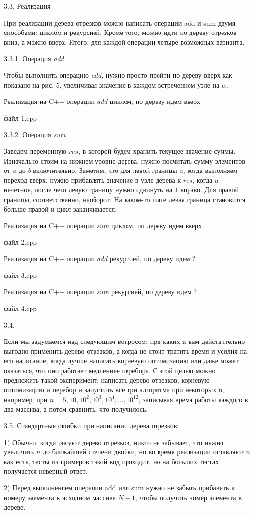 \documentclass[11pt,a4paper,oneside]{article}
\begin{document}
3.3. Реализация

При реализации дерева отрезков можно написать операции add и sum 
двумя способами: циклом и рекурсией. Кроме того, можно идти по 
дереву отрезков вниз, а можно вверх. Итого, для каждой операции 
четыре возможных варианта.

3.3.1. Операция {\it add}

Чтобы выполнить операцию {\it add}, нужно просто пройти по дереву вверх 
как показано на рис. 5, увеличивая значение в каждом 
встреченном узле на $w$. 

Реализация на C++ операции {\it add} циклом, по дереву идем вверх

файл 1.cpp

3.3.2. Операция {\it sum}

Заведем переменную $res$, в которой будем хранить текущее 
значение суммы. Изначально стоим на нижнем уровне дерева,
нужно посчитать сумму элементов от $a$ до $b$ включительно.
Заметим, что для левой границы $a$, когда выполняем переход вверх,
нужно прибавлять значение в узле дерева к $res$, когда $a$ - 
нечетное, после чего левую границу нужно сдвинуть на $1$ вправо.
Для правой границы, соответственно, наоборот. На каком-то шаге
левая граница становится больше правой и цикл заканчивается.
 
Реализация на C++ операции {\it sum} циклом, по дереву идем вверх

файл 2.cpp

Реализация на C++ операции {\it add} рекурсией, по дереву идем ?

файл 3.cpp

Реализация на C++ операции {\it sum} рекурсией, по дереву идем ?

файл 4.cpp  

3.4.

Если мы задумаемся над следующим вопросом: при каких n нам действительно выгодно применить 
дерево отрезков, а когда не стоит тратить время и усилия на его написание, когда лучше написать 
корневую оптимизацию или даже может оказаться, что оно работает медленнее перебора.
С этой целью можно предложить такой эксперимент:
написать дерево отрезков, корневую оптимизацию и перебор и запустить все три алгоритма при некоторых n, например, при 
$n = 5, 10, 10^2, 10^3, 10^4,\ldots, 10^{12}$, записывая время работы каждого в два массива, а потом сравнить, 
что получилось.

3.5. Стандартные ошибки при написании дерева отрезков:

1) Обычно, когда рисуют дерево отрезков, никто не забывает, что нужно увеличить $n$ до 
ближайшей степени двойки, но во время реализации оставляют $n$ как есть, тесты из примеров 
такой код проходит, но на больших тестах получается неверный ответ.

2) Перед выполнением операции add или sum нужно не забыть прибавить 
к номеру элемента в исходном массиве 
$N-1$, чтобы получить номер элемента в дереве.

\end{document}
